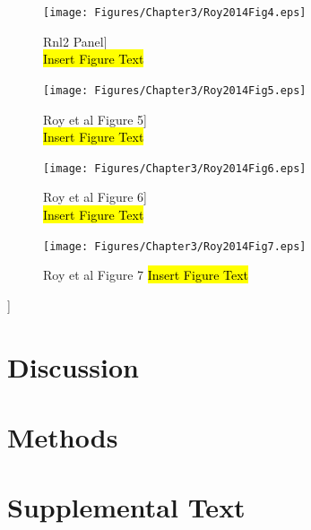 		\begin{figure}[htbp] %
			\centering 
			\texttt{[image: Figures/Chapter3/Roy2014Fig4.eps]}
			\caption[SeqZip Diagram]
			{
				Rnl2 Panel]\\
				\hl{Insert Figure Text}
				}
			\label{fig:Roy2014 F4}
			\end{figure}

		\begin{figure}[htbp] %
			\centering 
			\texttt{[image: Figures/Chapter3/Roy2014Fig5.eps]}
			\caption[SeqZip Diagram]
			{
				Roy et al Figure 5]\\
				\hl{Insert Figure Text}
				}
			\label{fig:Roy2014 F5}
			\end{figure}

		\begin{figure}[htbp] %
			\centering 
			\texttt{[image: Figures/Chapter3/Roy2014Fig6.eps]}
			\caption[SeqZip Diagram]
			{
				Roy et al Figure 6]\\
				\hl{Insert Figure Text}
				}
			\label{fig:Roy2014 F6}
			\end{figure}

		\begin{figure}[htbp] %
			\centering 
			\texttt{[image: Figures/Chapter3/Roy2014Fig7.eps]}
			\caption[SeqZip Diagram]
			{
				Roy et al Figure 7
				\hl{Insert Figure Text}
				}
			\label{fig:Roy2014 F7}
			\end{figure}]
			
\section{Discussion}\label{c3sec: Discussion}

\section{Methods}\label{c3sec: Methods}

\section{Supplemental Text}\label{c1sec: Supplemental Text}



